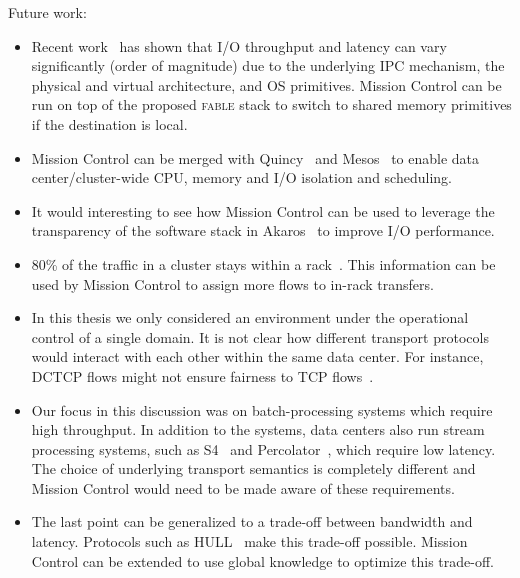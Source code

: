 \documentclass[a4paper,12pt,twoside,openright]{report}
\begin{document}
Future work:

\begin{itemize}
  \item Recent work~\cite{Smith:2012:TCF} has shown that I/O throughput
	and latency can vary significantly (order of magnitude) due to the underlying
	IPC mechanism, the physical and virtual architecture, and OS primitives.
	Mission Control can be run on top of the proposed \textsc{fable} stack to
	switch to shared memory primitives if the destination is local.
   \item Mission Control can be merged with Quincy~\cite{Isard:2009:QFS} and
   Mesos~\cite{Hindman:2011:MPF} to enable data center/cluster-wide CPU, memory
   and I/O isolation and scheduling.
   \item It would interesting to see how Mission Control can be used to leverage
   the transparency of the software stack in Akaros~\cite{Rhoden:2011:IPE} to
   improve I/O performance.
   \item 80\% of the traffic in a cluster stays within a
   rack~\cite{Benson:2010:NTC}. This information can be used by Mission Control
   to assign more flows to in-rack transfers.
   \item In this thesis we only considered an environment under the operational
	control of a single domain. It is not clear how different transport protocols
	would interact with each other within the same data center. For instance,
	DCTCP flows might not ensure fairness to TCP flows~\cite{Alizadeh:2010:DCT}.
	\item Our focus in this discussion was on batch-processing systems which
	require high throughput. In addition to the systems, data centers also run
	stream processing systems, such as S4~\cite{Neumeyer:2010:SDS} and
	Percolator~\cite{Peng:2010:LIP}, which require low latency. The choice of
	underlying transport semantics is completely different and Mission Control
	would need to be made aware of these requirements.
	\item The last point can be generalized to a trade-off between bandwidth and
	latency. Protocols such as HULL~\cite{Alizadeh:2012:LIM} make this trade-off
	possible. Mission Control can be extended to use global knowledge to optimize
	this trade-off.
\end{itemize}

\appendix
\singlespacing

 
 
\end{document}
